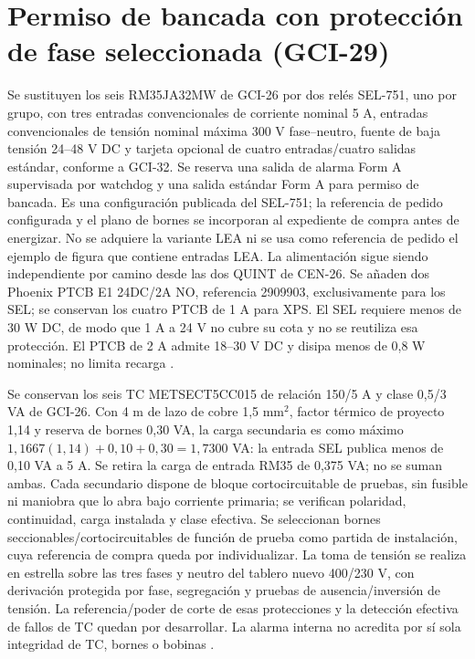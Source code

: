 \section{Permiso de bancada con protección de fase seleccionada (GCI-29)}
\label{sec:sd4-permiso-gci29}

Se sustituyen los seis RM35JA32MW de GCI-26 por dos relés SEL-751, uno por grupo, con tres entradas convencionales de corriente nominal 5 A, entradas convencionales de tensión nominal máxima 300 V fase--neutro, fuente de baja tensión 24--48 V DC y tarjeta opcional de cuatro entradas/cuatro salidas estándar, conforme a GCI-32. Se reserva una salida de alarma Form A supervisada por watchdog y una salida estándar Form A para permiso de bancada. Es una configuración publicada del SEL-751; la referencia de pedido configurada y el plano de bornes se incorporan al expediente de compra antes de energizar. No se adquiere la variante LEA ni se usa como referencia de pedido el ejemplo de figura que contiene entradas LEA. La alimentación sigue siendo independiente por camino desde las dos QUINT de CEN-26. Se añaden dos Phoenix PTCB E1 24DC/2A NO, referencia 2909903, exclusivamente para los SEL; se conservan los cuatro PTCB de 1 A para XPS. El SEL requiere menos de 30 W DC, de modo que 1 A a 24 V no cubre su cota y no se reutiliza esa protección. El PTCB de 2 A admite 18--30 V DC y disipa menos de 0,8 W nominales; no limita recarga \parencites[pp.~2, 30--35 y 38--40]{lote29-sel751}{lote29-ptcb2}.

Se conservan los seis TC METSECT5CC015 de relación 150/5 A y clase 0,5/3 VA de GCI-26. Con 4 m de lazo de cobre 1,5 mm$^2$, factor térmico de proyecto 1,14 y reserva de bornes 0,30 VA, la carga secundaria es como máximo $1,1667(1,14)+0,10+0,30=1,7300$ VA: la entrada SEL publica menos de 0,10 VA a 5 A. Se retira la carga de entrada RM35 de 0,375 VA; no se suman ambas. Cada secundario dispone de bloque cortocircuitable de pruebas, sin fusible ni maniobra que lo abra bajo corriente primaria; se verifican polaridad, continuidad, carga instalada y clase efectiva. Se seleccionan bornes seccionables/cortocircuitables de función de prueba como partida de instalación, cuya referencia de compra queda por individualizar. La toma de tensión se realiza en estrella sobre las tres fases y neutro del tablero nuevo 400/230 V, con derivación protegida por fase, segregación y pruebas de ausencia/inversión de tensión. La referencia/poder de corte de esas protecciones y la detección efectiva de fallos de TC quedan por desarrollar. La alarma interna no acredita por sí sola integridad de TC, bornes o bobinas \parencites[p.~33]{lote29-sel751}[pp.~1--2]{lote29-selhealth}[p.~1]{lote26-ct}.

